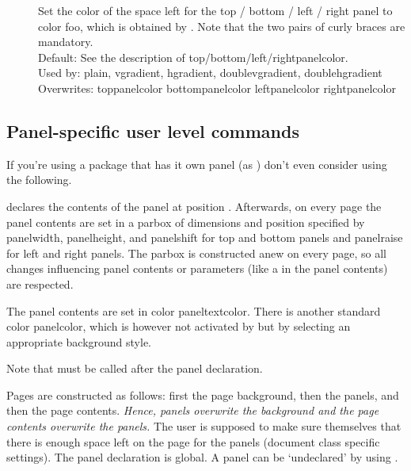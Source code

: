 \documentclass[12pt]{scrartcl}
\let\newslide=\relax
\begin{document}
\begin{description}
 \item[]
    Set the color of the space left for the top / bottom / left / right panel
    to color foo, which is obtained by
    .
    Note that the two pairs of curly braces are mandatory. \\
    Default: See the description of top/bottom/left/rightpanelcolor.\\
    Used by: plain, vgradient, hgradient, doublevgradient, doublehgradient\\
    Overwrites: toppanelcolor bottompanelcolor leftpanelcolor rightpanelcolor

  \end{description}

  \newslide

  \subsection{Panel-specific user level commands}
  If you're using a package that has it own panel (as
  \href{ftp://ftp.dante.de/tex-archive/help/Catalogue/entries/pdfscreen.html}%
  {}) don't even consider using the following.

  declares the contents  of the panel at position .
  Afterwards, on every page the panel contents are set in a parbox of
  dimensions and position specified by panelwidth,
  panelheight,  and panelshift for
  top and bottom panels and panelraise for left and right panels. The
  parbox is constructed anew on every page, so all changes influencing panel
  contents or parameters (like a  in the panel contents) are
  respected.

  The panel contents are set in color paneltextcolor. There is
  another standard color panelcolor, which is however not activated by
   but by selecting an appropriate background style.

  Note that  must be called after the panel
  declaration.

  \newslide

  Pages are constructed as follows: first the page background, then
  the panels, and then the page contents. \emph{Hence, panels overwrite the background
  and the page contents overwrite the panels.} The user is supposed to make sure
  themselves that there is enough space left on the page for the panels
  (document class specific settings).  The panel declaration is global. A panel
  can be `undeclared' by using .
\end{document}
